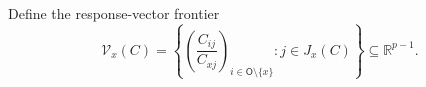 Define the response-vector frontier
\[
 \mathcal V_x(C)
 =\left\{
 \left(\frac{C_{ij}}{C_{xj}}\right)_{i\in\mathsf O\setminus\{x\}}
 :j\in J_x(C)
 \right\}\subseteq\mathbb R^{p-1}.
\]